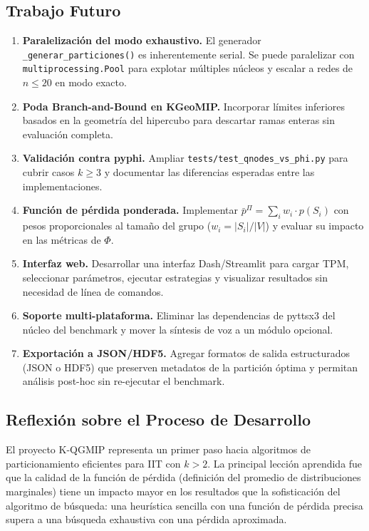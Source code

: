 \subsection{Trabajo Futuro}

\begin{enumerate}[label=\textbf{\arabic*.}]
    \item \textbf{Paralelización del modo exhaustivo.}
        El generador \texttt{\_generar\_particiones()} es inherentemente serial. Se puede paralelizar con \texttt{multiprocessing.Pool} para explotar múltiples núcleos y escalar a redes de $n \leq 20$ en modo exacto.

    \item \textbf{Poda Branch-and-Bound en KGeoMIP.}
        Incorporar límites inferiores basados en la geometría del hipercubo para descartar ramas enteras sin evaluación completa.

    \item \textbf{Validación contra pyphi.}
        Ampliar \texttt{tests/test\_qnodes\_vs\_phi.py} para cubrir casos $k \geq 3$ y documentar las diferencias esperadas entre las implementaciones.

    \item \textbf{Función de pérdida ponderada.}
        Implementar $\bar{p}^\Pi = \sum_i w_i \cdot p(S_i)$ con pesos proporcionales al tamaño del grupo ($w_i = |S_i|/|V|$) y evaluar su impacto en las métricas de $\Phi$.

    \item \textbf{Interfaz web.}
        Desarrollar una interfaz Dash/Streamlit para cargar TPM, seleccionar parámetros, ejecutar estrategias y visualizar resultados sin necesidad de línea de comandos.

    \item \textbf{Soporte multi-plataforma.}
        Eliminar las dependencias de pyttsx3 del núcleo del benchmark y mover la síntesis de voz a un módulo opcional.

    \item \textbf{Exportación a JSON/HDF5.}
        Agregar formatos de salida estructurados (JSON o HDF5) que preserven metadatos de la partición óptima y permitan análisis post-hoc sin re-ejecutar el benchmark.
\end{enumerate}

\subsection{Reflexión sobre el Proceso de Desarrollo}

El proyecto K-QGMIP representa un primer paso hacia algoritmos de particionamiento eficientes para IIT con $k > 2$. La principal lección aprendida fue que la calidad de la función de pérdida (definición del promedio de distribuciones marginales) tiene un impacto mayor en los resultados que la sofisticación del algoritmo de búsqueda: una heurística sencilla con una función de pérdida precisa supera a una búsqueda exhaustiva con una pérdida aproximada.
